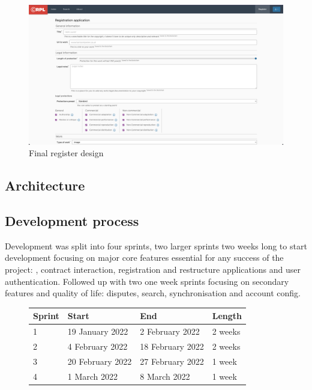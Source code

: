 \begin{figure}[H]
\caption{Final register design}
\centering
\includegraphics[width=\textwidth,height=0.5\textheight,keepaspectratio]{images/wireframe/register-real}
\end{figure}

\subsection{Architecture}

\subsection{Development process}

Development was split into four sprints, two larger sprints two weeks long to start development focusing on major core features essential for any success of the project: , contract interaction, registration and restructure applications and user authentication. Followed up with two one week sprints focusing on secondary features and quality of life: disputes, search, synchronisation and account config. 

\begin{figure}[H]
\hfil
\begin{tabular}{|l|l|l|l|}
\hline
Sprint & Start            & End              & Length  \\ \hline
1      & 19 January 2022  & 2 February 2022  & 2 weeks \\ \hline
2      & 4 February 2022  & 18 February 2022 & 2 weeks \\ \hline
3      & 20 February 2022 & 27 February 2022 & 1 week  \\ \hline
4      & 1 March 2022     & 8 March 2022     & 1 week  \\ \hline
\end{tabular}
\end{figure}